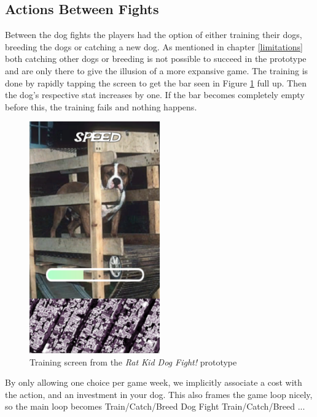 \subsection{Actions Between Fights} \label{weekly}
Between the dog fights the players had the option of either training their dogs, breeding the dogs or catching a new dog. As mentioned in chapter \ref{limitations} both catching other dogs or breeding is not possible to succeed in the prototype and are only there to give the illusion of a more expansive game. The training is done by rapidly tapping the screen to get the bar seen in Figure \ref{fig:training} full up. Then the dog's respective stat increases by one. If the bar becomes completely empty before this, the training fails and nothing happens.\ 

\begin{figure}[h!] 
	\centering
    \includegraphics[width=0.5\textwidth]{Training.png}
    \caption{Training screen from the \textit{Rat Kid Dog Fight!} prototype}
    \label{fig:training}
\end{figure}

By only allowing one choice per game week, we implicitly associate a cost with the action, and an investment in your dog. This also frames the game loop nicely, so the main loop becomes Train/Catch/Breed \rightarrow Dog Fight \rightarrow Train/Catch/Breed \rightarrow ...